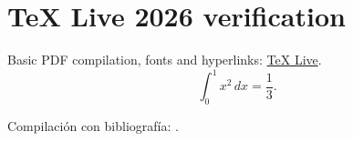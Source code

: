 \documentclass{article}
\begin{document}
\section{TeX Live 2026 verification}
Basic PDF compilation, fonts and hyperlinks: \href{https://tug.org/texlive/}{TeX Live}.
\[
\int_0^1 x^2\,dx = \frac{1}{3}.
\]
\begin{tcolorbox}[title=Verificaci\'on en espa\~nol]
Compilaci\'on con bibliograf\'ia: \cite{knuth1984}.
\end{tcolorbox}
\printbibliography
\end{document}
